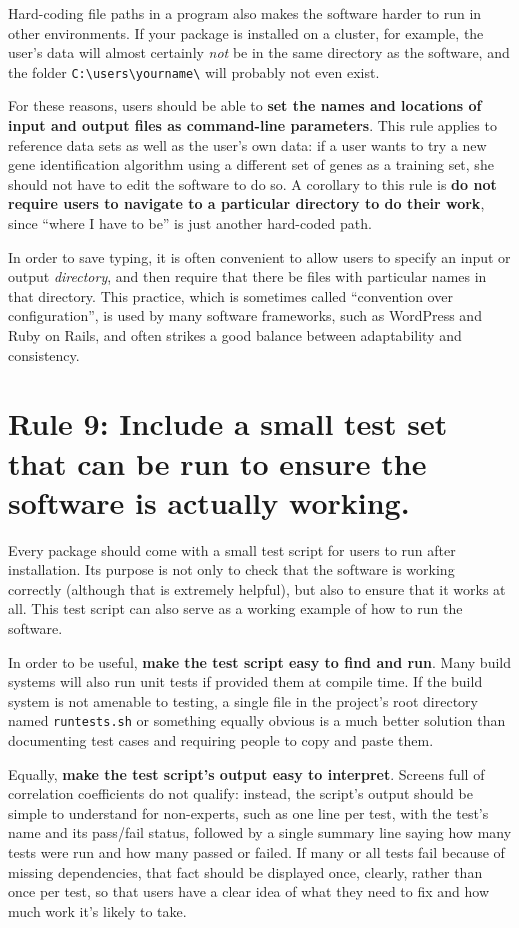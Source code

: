 \documentclass[10pt,letterpaper]{article}
\newcommand{\rulemajor}[1]{\section{#1}}
\newcommand{\ruleminor}[1]{\textbf{#1}}
\begin{document}
Hard-coding file paths in a program also makes the software harder to run
in other environments. If your package is installed on a cluster, for
example, the user's data will almost certainly \emph{not} be in the same
directory as the software, and the folder
\texttt{C:\textbackslash{}users\textbackslash{}yourname\textbackslash{}}
will probably not even exist.

For these reasons, users should be able to
\ruleminor{set the names and locations of input and output files as command-line parameters}.
This rule applies to reference data sets as well as the user's own
data: if a user wants to try a new gene identification algorithm using
a different set of genes as a training set, she should not have to
edit the software to do so.
A corollary to this rule is
\ruleminor{do not require users to navigate to a particular directory to do their work},
since ``where I have to be'' is just another hard-coded path.

In order to save typing, it is often convenient to allow users to
specify an input or output \emph{directory}, and then require that there
be files with particular names in that directory. This practice, which
is sometimes called ``convention over configuration'', is used by many
software frameworks, such as WordPress and Ruby on Rails, and often
strikes a good balance between adaptability and consistency.

\rulemajor{Rule 9: Include a small test set that can be run to ensure the software is actually working.}

Every package should come with a small test script for users to run
after installation. Its purpose is not only to check that the software
is working correctly (although that is extremely helpful), but also to
ensure that it works at all. This test script can also serve as a
working example of how to run the software.

In order to be useful, \ruleminor{make the test script easy to find and run}. 
Many build systems will also run unit tests if provided them at compile time.
If the build system is not amenable to testing, a 
single file in the project's root directory named \texttt{runtests.sh}
or something equally obvious is a much better solution than documenting
test cases and requiring people to copy and paste them.

Equally, \ruleminor{make the test script's output easy to interpret}. Screens
full of correlation coefficients do not qualify: instead, the script's
output should be simple to understand for non-experts,
such as one line per test, with the test's name
and its pass/fail status, followed by a single summary line saying how
many tests were run and how many passed or failed. If many or all tests
fail because of missing dependencies, that fact should be displayed
once, clearly, rather than once per test, so that users have a clear
idea of what they need to fix and how much work it's likely to take.
\end{document}
